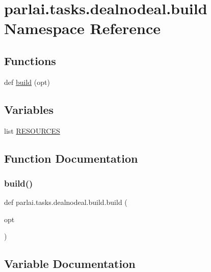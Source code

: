 \hypertarget{namespaceparlai_1_1tasks_1_1dealnodeal_1_1build}{}\section{parlai.\+tasks.\+dealnodeal.\+build Namespace Reference}
\label{namespaceparlai_1_1tasks_1_1dealnodeal_1_1build}
\subsection*{Functions}
\begin{DoxyCompactItemize}
\item 
def \hyperlink{namespaceparlai_1_1tasks_1_1dealnodeal_1_1build_a964c2b43bf49102b9541d584d10d8632}{build} (opt)
\end{DoxyCompactItemize}
\subsection*{Variables}
\begin{DoxyCompactItemize}
\item 
list \hyperlink{namespaceparlai_1_1tasks_1_1dealnodeal_1_1build_a241dcbf765e96f5beed61989453698a9}{R\+E\+S\+O\+U\+R\+C\+ES}
\end{DoxyCompactItemize}


\subsection{Function Documentation}
\mbox{\label{namespaceparlai_1_1tasks_1_1dealnodeal_1_1build_a964c2b43bf49102b9541d584d10d8632}} 
\subsubsection{\texorpdfstring{build()}{build()}}
{\footnotesize\ttfamily def parlai.\+tasks.\+dealnodeal.\+build.\+build (\begin{DoxyParamCaption}\item[{}]{opt }\end{DoxyParamCaption})}



\subsection{Variable Documentation}
\mbox{\label{namespaceparlai_1_1tasks_1_1dealnodeal_1_1build_a241dcbf765e96f5beed61989453698a9}} 
